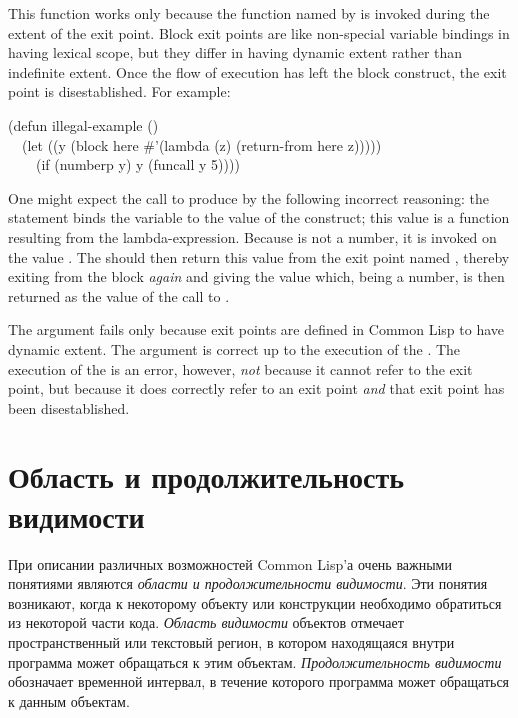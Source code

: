 This function  works only because the
function named by  is invoked during the extent of the exit point.
Block exit points are like non-special variable bindings in having
lexical scope, but they differ in having dynamic extent rather than indefinite
extent.  Once the flow of execution has left the block construct,
the exit point is disestablished.  For example:

\begin{lisp}
(defun illegal-example () \\
~~(let ((y (block here \#'(lambda (z) (return-from here z))))) \\
~~~~(if (numberp y) y (funcall y 5))))
\end{lisp}

One might expect the call  to produce 
by the following incorrect reasoning:
the  statement binds the variable  to the
value of the  construct; this value is a function resulting
from the lambda-expression.  Because  is not a number, it is
invoked on the value .  The  should then
return this value from the exit point named , thereby
exiting from the block \emph{again} and giving  the value 
which, being a number, is then returned as the value of the call
to .

The argument fails only because exit points are defined in Common Lisp
to have dynamic extent.  The argument is correct up to the execution
of the .  The execution of the  is
an error, however, \emph{not} because it cannot refer to the exit point,
but because it does correctly refer to an exit point \emph{and}
that exit point has been disestablished.

\else

\chapter{Область и продолжительность видимости}
\label{SCOPE}

При описании различных возможностей Common Lisp'а очень важными понятиями
являются \emph{области и продолжительности видимости}. Эти понятия возникают,
когда к некоторому объекту или конструкции необходимо обратиться из некоторой
части кода. \emph{Область видимости} объектов отмечает пространственный или
текстовый регион, в котором находящаяся внутри программа может обращаться к этим 
объектам. \emph{Продолжительность видимости} обозначает временной интервал, в
течение которого программа может обращаться к данным объектам.

